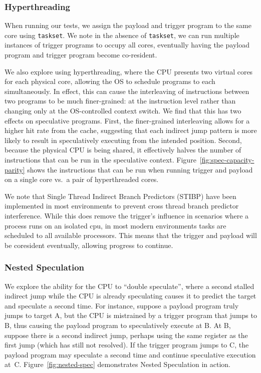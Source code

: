 \subsubsection{Hyperthreading}
\label{sssec:hyperthread}

\FigSpecMeasureParity

When running our tests, we assign the payload and trigger program to the same
core using \texttt{taskset}. We note in the absence of \texttt{taskset}, we can
run multiple instances of trigger programs to occupy all cores, eventually
having the payload program and trigger program become co-resident.

We also explore using hyperthreading, where the CPU presents two virtual cores
for each physical core, allowing the OS to schedule programs to each
simultaneously. In effect, this can cause the interleaving of instructions
between two programs to be much finer-grained: at the instruction level rather
than changing only at the OS-controlled context switch. We find that this
has two effects on speculative programs. First, the finer-grained interleaving
allows for a higher hit rate from the cache, suggesting that each indirect jump
pattern is more likely to result in speculatively executing from the intended
position. %
Second, because the physical CPU is being shared, it effectively halves the
number of instructions that can be run in the speculative context.
Figure~\ref{fig:spec-capacity-parity} shows the instructions that can be run when
running trigger and payload on a single core vs.\ a pair of hyperthreaded cores.

We note that Single Thread Indirect Branch Predictors (STIBP) have been implemented
in most environments to prevent cross thread branch predictor interference.
While this does remove the \speculake trigger's influence in scenarios where a
process runs on an isolated cpu, in most modern environments
tasks are scheduled to all available processors. This means that the trigger and
payload will be coresident eventually, allowing progress to continue.


\subsubsection{Nested Speculation}
\label{sssec:nested-spec}

We explore the ability for the CPU to ``double speculate'', where a second
stalled indirect jump while the CPU is already speculating causes it to predict
the target and speculate a second time. For instance, suppose a payload program
truly jumps to target A, but the CPU is mistrained by a trigger program that
jumps to B, thus causing the payload program to speculatively execute at B. At
B, suppose there is a second indirect jump, perhaps using the same register as
the first jump (which has still not resolved). If the trigger program jumps to
C, the payload program may speculate a second time and continue speculative
execution at~C. Figure~\ref{fig:nested-spec} demonstrates Nested Speculation in
action.

